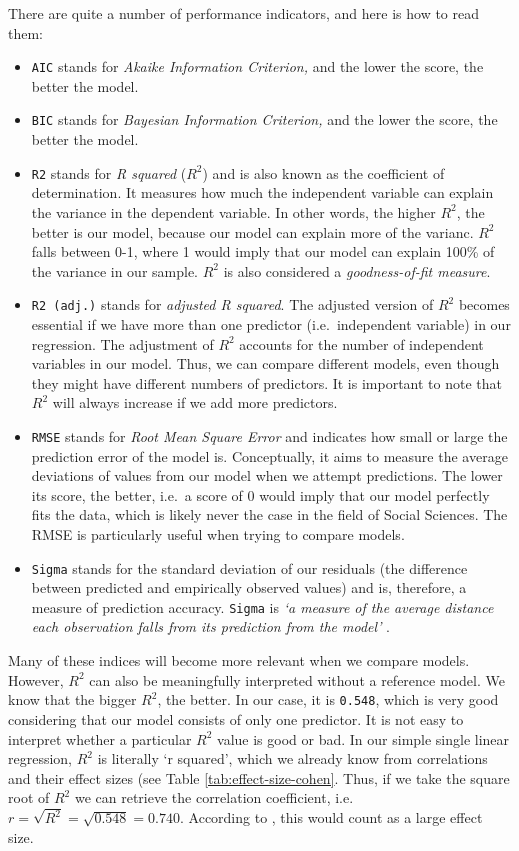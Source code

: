 \documentclass[
]{book}
\begin{document}
There are quite a number of performance indicators, and here is how to read them:

\begin{itemize}
\item
  \texttt{AIC} stands for \emph{Akaike Information Criterion,} and the lower the score, the better the model.
\item
  \texttt{BIC} stands for \emph{Bayesian Information Criterion,} and the lower the score, the better the model.
\item
  \texttt{R2} stands for \emph{R squared} (\(R^2\)) and is also known as the coefficient of determination. It measures how much the independent variable can explain the variance in the dependent variable. In other words, the higher \(R^2\), the better is our model, because our model can explain more of the varianc. \(R^2\) falls between 0-1, where 1 would imply that our model can explain 100\% of the variance in our sample. \(R^2\) is also considered a \emph{goodness-of-fit measure}.
\item
  \texttt{R2\ (adj.)} stands for \emph{adjusted R squared}. The adjusted version of \(R^2\) becomes essential if we have more than one predictor (i.e.~independent variable) in our regression. The adjustment of \(R^2\) accounts for the number of independent variables in our model. Thus, we can compare different models, even though they might have different numbers of predictors. It is important to note that \(R^2\) will always increase if we add more predictors.
\item
  \texttt{RMSE} stands for \emph{Root Mean Square Error} and indicates how small or large the prediction error of the model is. Conceptually, it aims to measure the average deviations of values from our model when we attempt predictions. The lower its score, the better, i.e.~a score of 0 would imply that our model perfectly fits the data, which is likely never the case in the field of Social Sciences. The RMSE is particularly useful when trying to compare models.
\item
  \texttt{Sigma} stands for the standard deviation of our residuals (the difference between predicted and empirically observed values) and is, therefore, a measure of prediction accuracy. \texttt{Sigma} is \emph{`a measure of the average distance each observation falls from its prediction from the model'} \citep[p.~168]{gelman2020regression}.
\end{itemize}

Many of these indices will become more relevant when we compare models. However, \(R^2\) can also be meaningfully interpreted without a reference model. We know that the bigger \(R^2\), the better. In our case, it is \texttt{0.548}, which is very good considering that our model consists of only one predictor. It is not easy to interpret whether a particular \(R^2\) value is good or bad. In our simple single linear regression, \(R^2\) is literally `r squared', which we already know from correlations and their effect sizes (see Table \ref{tab:effect-size-cohen}. Thus, if we take the square root of \(R^2\) we can retrieve the correlation coefficient, i.e.~\(r = \sqrt{R^2} = \sqrt{0.548} = 0.740\). According to \citet{cohen1988statistical}, this would count as a large effect size.
\end{document}
